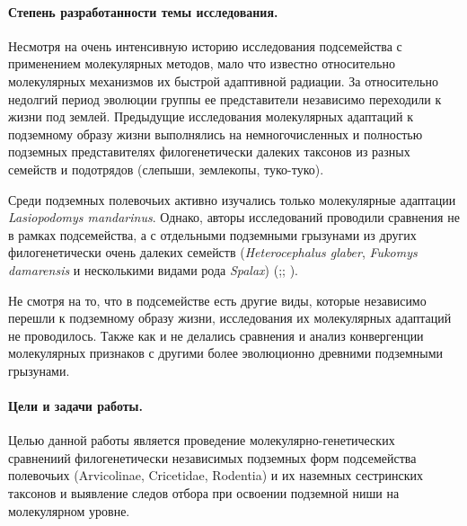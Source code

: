 

\paragraph{Степень разработанности темы исследования.} Несмотря на очень интенсивную историю исследования подсемейства с применением молекулярных методов, мало что известно относительно молекулярных механизмов их быстрой адаптивной радиации. За относительно недолгий период эволюции группы ее представители независимо переходили к жизни под землей. Предыдущие исследования молекулярных адаптаций к подземному образу жизни выполнялись на немногочисленных и полностью подземных представителях филогенетически далеких таксонов из разных семейств и подотрядов (слепыши, землекопы, туко-туко). 


Среди подземных полевочьих активно изучались только молекулярные адаптации \textit{Lasiopodomys mandarinus}. Однако, авторы исследований проводили сравнения не в рамках подсемейства, а с отдельными подземными грызунами из других филогенетически очень далеких семейств (\textit{Heterocephalus glaber}, \textit{Fukomys damarensis} и несколькими видами рода \textit{Spalax}) (\cite{Sun2020};\cite{Sun2018a}; \cite{Dong2020}).

Не смотря на то, что в подсемействе есть другие виды, которые независимо перешли к подземному образу жизни, исследования их молекулярных адаптаций не проводилось. Также как и не делались сравнения и анализ конвергенции молекулярных признаков с другими более эволюционно древними подземными грызунами.

\paragraph{Цели и задачи работы.} Целью данной работы является проведение молекулярно-генетических сравнениий филогенетически независимых подземных форм подсемейства полевочьих (Arvicolinae, Cricetidae, Rodentia) и их наземных сестринских таксонов и выявление следов отбора при освоении подземной ниши на молекулярном уровне.

